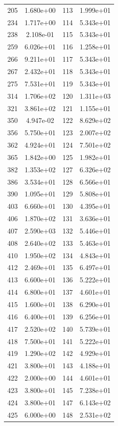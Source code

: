 \documentclass[12pt]{article}
\begin{document}
\begin{longtable}{@{}cccc@{}}
205 & 1.680e+00 & 113 & 1.999e+01 \\
234 & 1.717e+00 & 114 & 5.343e+01 \\
238 & 2.108e-01 & 115 & 5.343e+01 \\
259 & 6.026e+01 & 116 & 1.258e+01 \\
266 & 9.211e+01 & 117 & 5.343e+01 \\
267 & 2.432e+01 & 118 & 5.343e+01 \\
275 & 7.531e+01 & 119 & 5.343e+01 \\
314 & 1.706e+02 & 120 & 1.311e+03 \\
321 & 3.861e+02 & 121 & 1.155e+01 \\
350 & 4.947e-02 & 122 & 8.629e+02 \\
356 & 5.750e+01 & 123 & 2.007e+02 \\
362 & 4.924e+01 & 124 & 7.501e+02 \\
365 & 1.842e+00 & 125 & 1.982e+01 \\
382 & 1.353e+02 & 127 & 6.326e+02 \\
386 & 3.534e+01 & 128 & 6.566e+01 \\
390 & 1.095e+01 & 129 & 5.808e+01 \\
403 & 6.660e+01 & 130 & 4.395e+01 \\
406 & 1.870e+02 & 131 & 3.636e+01 \\
407 & 2.590e+03 & 132 & 5.446e+01 \\
408 & 2.640e+02 & 133 & 5.463e+01 \\
410 & 1.950e+02 & 134 & 4.843e+01 \\
412 & 2.469e+01 & 135 & 6.497e+01 \\
413 & 6.600e+01 & 136 & 5.222e+01 \\
414 & 6.800e+01 & 137 & 4.601e+01 \\
415 & 1.600e+01 & 138 & 6.290e+01 \\
416 & 6.400e+01 & 139 & 6.256e+01 \\
417 & 2.520e+02 & 140 & 5.739e+01 \\
418 & 7.500e+01 & 141 & 5.222e+01 \\
419 & 1.290e+02 & 142 & 4.929e+01 \\
421 & 3.800e+01 & 143 & 4.188e+01 \\
422 & 2.000e+00 & 144 & 4.601e+01 \\
423 & 3.800e+01 & 145 & 7.238e+01 \\
424 & 3.800e+01 & 147 & 6.143e+02 \\
425 & 6.000e+00 & 148 & 2.531e+02 \\

\end{longtable}
\end{document}
